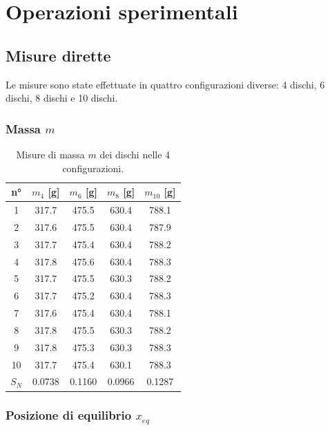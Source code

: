 \documentclass[titlepage]{article}
\numberwithin{equation}{section}
\numberwithin{figure}{section}
\numberwithin{table}{section}
\begin{document}
\pagebreak
\section{Operazioni sperimentali}

\subsection{Misure dirette}

Le misure sono state effettuate in quattro configurazioni diverse: 4 dischi, 6 dischi, 8 dischi e 10 dischi.

\subsubsection{Massa \texorpdfstring{$m$}{m}}

\begin{table}[ht]
  \centering
  \begin{tabular}{ccccc}
    \toprule
    n° & $m_4$ [\si{\gram}] & $m_6$ [\si{\gram}] & $m_8$ [\si{\gram}] & $m_{10}$ [\si{\gram}] \\
    \midrule
    1  & 317.7 & 475.5 & 630.4 & 788.1 \\
    2  & 317.6 & 475.5 & 630.4 & 787.9 \\
    3  & 317.7 & 475.4 & 630.4 & 788.2 \\
    4  & 317.8 & 475.6 & 630.4 & 788.3 \\
    5  & 317.7 & 475.5 & 630.3 & 788.2 \\
    6  & 317.7 & 475.2 & 630.4 & 788.3 \\
    7  & 317.6 & 475.4 & 630.4 & 788.1 \\
    8  & 317.8 & 475.5 & 630.3 & 788.2 \\
    9  & 317.8 & 475.3 & 630.3 & 788.3 \\
    10 & 317.7 & 475.4 & 630.1 & 788.3 \\
    \midrule
    $S_N$ & 0.0738 & 0.1160 & 0.0966 & 0.1287 \\
    \bottomrule
  \end{tabular}
  \caption{Misure di massa $m$ dei dischi nelle 4 configurazioni.}
\end{table}

\subsubsection{Posizione di equilibrio \texorpdfstring{$x_{eq}$}{xeq}}
\end{document}
